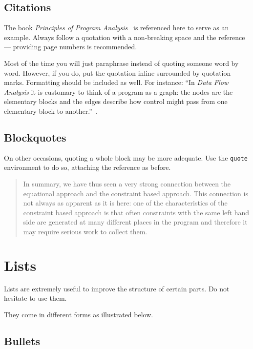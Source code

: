 \subsection{Citations}

The book \emph{Principles of Program Analysis}~\cite{Nielson:ppa} is referenced here to serve as an example.
Always follow a quotation with a non-breaking space and the reference --- providing page numbers is recommended.

Most of the time you will just paraphrase instead of quoting someone word by word.
However, if you do, put the quotation inline surrounded by quotation marks.
Formatting should be included as well.
For instance: ``In \emph{Data Flow Analysis} it is customary to think of a program as a graph: the nodes are the elementary blocks and the edges describe how control might pass from one elementary block to another.''~\cite[p.~5]{Nielson:ppa}.

\subsection{Blockquotes}

On other occasions, quoting a whole block may be more adequate.
Use the \texttt{quote} environment to do so, attaching the reference as before.

\begin{quote}
	In summary, we have thus seen a very strong connection between the equational approach and the constraint based approach.
	This connection is not always as apparent as it is here: one of the characteristics of the constraint based approach is that often constraints with the same left hand side are generated at many different places in the program and therefore it may require serious work to collect them.~\cite[p.~10]{Nielson:ppa}
\end{quote}

\section{Lists}

Lists are extremely useful to improve the structure of certain parts.
Do not hesitate to use them.

They come in different forms as illustrated below.

\subsection{Bullets}

